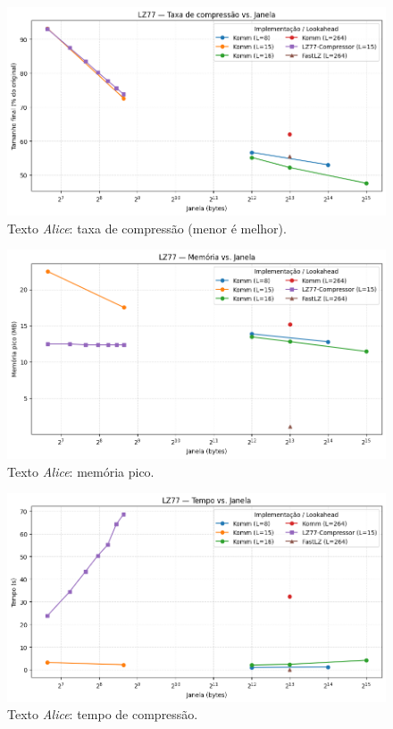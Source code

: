 \begin{figure}[htp]
  \centering
  \caption{Texto \textit{Alice}: taxa de compressão (menor é melhor).}
  \label{fig:external-alice-compression}
  \includegraphics[width=15cm]{figuras/lz77_alice_compression_window.png}
\end{figure}

\begin{figure}[htp]
  \centering
  \caption{Texto \textit{Alice}: memória pico.}
  \label{fig:external-alice-memory}
  \includegraphics[width=15cm]{figuras/lz77_alice_memory_window.png}
\end{figure}

\begin{figure}[htp]
  \centering
  \caption{Texto \textit{Alice}: tempo de compressão.}
  \label{fig:external-alice-time}
  \includegraphics[width=15cm]{figuras/lz77_alice_time_window.png}
\end{figure}


